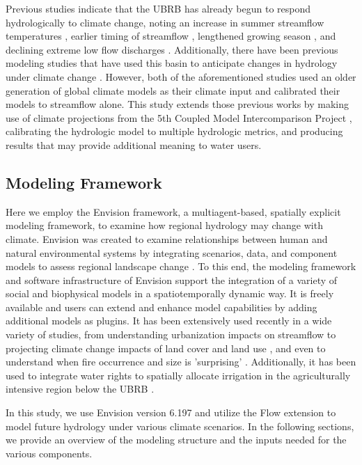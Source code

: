 \documentclass[11pt,letterpaper]{article}
\begin{document}
Previous studies indicate that the UBRB has already begun to respond hydrologically to climate change, noting an increase in summer streamflow temperatures \citep{Isaak:2010fn}, earlier timing of streamflow \citep{Clark:2010bq}, lengthened growing season \citep{Kunkel:2004bh}, and declining extreme low flow discharges \citep{Kormos:2016hy}. Additionally, there have been previous modeling studies that have used this basin to anticipate changes in hydrology under climate change \citep{Stillwater:2008uf,Jin:2011ii}. However, both of the aforementioned studies used an older generation of global climate models as their climate input and calibrated their models to streamflow alone. This study extends those previous works by making use of climate projections from the 5th Coupled Model Intercomparison Project \citep[CMIP5,][]{Taylor:2012jga}, calibrating the hydrologic model to multiple hydrologic metrics, and producing results that may provide additional meaning to water users.

\subsection{Modeling Framework}
Here we employ the Envision framework, a multiagent-based, spatially explicit modeling framework, to examine how regional hydrology may change with climate. Envision was created to examine relationships between human and natural environmental systems by integrating scenarios, data, and component models to assess regional landscape change \citep{Bolte:2007tb}. To this end, the modeling framework and software infrastructure of Envision support the integration of a variety of social and biophysical models in a spatiotemporally dynamic way. It is freely available and users can extend and enhance model capabilities by adding additional models as plugins. It has been extensively used recently in a wide variety of studies, from understanding urbanization impacts on streamflow \citep{Wu:2015tx} to projecting climate change impacts of land cover and land use \citep{Turner:2015wn}, and even to understand when fire occurrence and size is 'surprising' \citep{Hulse:2016wy}. Additionally, it has been used to integrate water rights to spatially allocate irrigation in the agriculturally intensive region below the UBRB \citep{Han:2017tx}. 

In this study, we use Envision version 6.197 and utilize the Flow extension to model future hydrology under various climate scenarios. In the following sections, we provide an overview of the modeling structure and the inputs needed for the various components.
\end{document}
